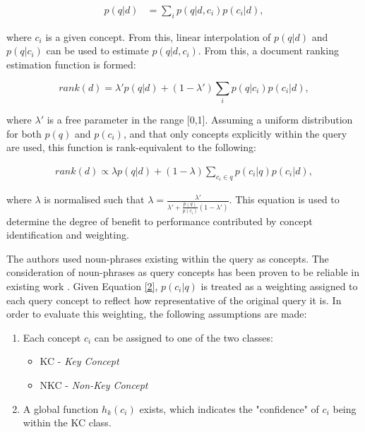 \documentclass[a4paper]{report}
\begin{document}
\begin{equation}
\label{one}
\begin{split}
p(q|d) &= \sum_{i}{p(q|d,c_i)p(c_i|d)},
\end{split}
\end{equation}

where $c_i$ is a given concept. From this, linear interpolation of $p(q|d)$ and $p(q|c_i)$ can be used to estimate $p(q|d,c_i)$. From this, a document ranking estimation function is formed:

$$rank(d) = \lambda' p(q|d) + (1-\lambda') \sum_{i}{p(q|c_i)p(c_i|d)},$$

where $\lambda'$ is a free parameter in the range [0,1]. Assuming a uniform distribution for both $p(q)$ and $p(c_i)$, and that only concepts explicitly within the query are used, this function is rank-equivalent to the following:

\begin{equation}
\label{2}
\begin{split}
rank(d) \propto \lambda p(q|d) + (1-\lambda) \sum_{c_i \in q}{p(c_i|q)p(c_i|d)},
\end{split}
\end{equation}

where $\lambda$ is normalised such that $\lambda = \frac{\lambda'}{\lambda' + \frac{p(q)}{p(c_i)} (1-\lambda')}$. This equation is used to determine the degree of benefit to performance contributed by concept identification and weighting.

The authors used noun-phrases existing within the query as concepts. The consideration of noun-phrases as query concepts has been proven to be reliable in existing work \cite{Xu:1996:QEU:243199.243202}. Given Equation \ref{2}, $p(c_i | q)$ is treated as a weighting assigned to each query concept to reflect how representative of the original query it is. In order to evaluate this weighting, the following assumptions are made:

\begin{enumerate}
  \item Each concept $c_i$ can be assigned to one of the two classes:
    \begin{itemize}
      \item KC - \textit{Key Concept}
      \item NKC - \textit{Non-Key Concept}
    \end{itemize}
  \item A global function $h_k(c_i)$ exists, which indicates the "confidence" of $c_i$ being within the KC class.
\end{enumerate}
\end{document}
